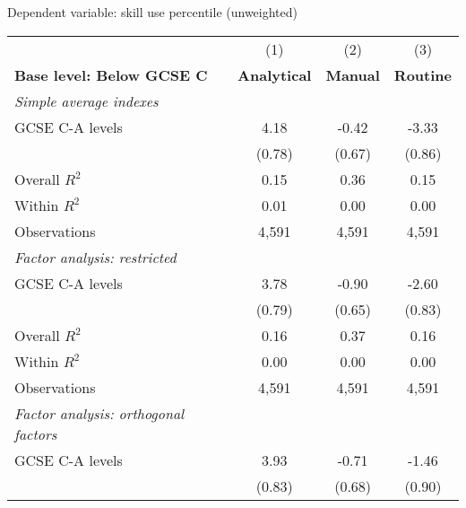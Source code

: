 \begin{center}
\begin{threeparttable}[!h]
\caption{Dependent variable: skill use percentile (unweighted)}
\label{tab:skillRegs}
\begin{tabular}{lccc}
\toprule
\toprule
&\multicolumn{1}{c}{(1)}&\multicolumn{1}{c}{(2)}&\multicolumn{1}{c}{(3)} \\
\textbf{Base level: Below GCSE C}&\multicolumn{1}{c}{\textbf{Analytical}}&\multicolumn{1}{c}{\textbf{Manual}}&\multicolumn{1}{c}{\textbf{Routine}} \\
\midrule
\textit{Simple average indexes} \vspace{1mm}\\ 
\hspace{3mm}GCSE C-A levels&        4.18\sym{***}&       -0.42         &       -3.33\sym{***}\\
                    &      (0.78)         &      (0.67)         &      (0.86)         \\
\midrule Overall $ R^2$&        0.15         &        0.36         &        0.15         \\
Within $ R^2$       &        0.01         &        0.00         &        0.00         \\
Observations        &       4,591         &       4,591         &       4,591         \\
\midrule\vspace{1mm} \textit{Factor analysis: restricted} \\ 
\hspace{3mm}GCSE C-A levels&        3.78\sym{***}&       -0.90         &       -2.60\sym{**} \\
                    &      (0.79)         &      (0.65)         &      (0.83)         \\
\midrule Overall $ R^2$&        0.16         &        0.37         &        0.16         \\
Within $ R^2$       &        0.00         &        0.00         &        0.00         \\
Observations        &       4,591         &       4,591         &       4,591         \\
\midrule\vspace{1mm} \textit{Factor analysis: orthogonal factors} \\ 
\hspace{3mm}GCSE C-A levels&        3.93\sym{***}&       -0.71         &       -1.46         \\
                    &      (0.83)         &      (0.68)         &      (0.90)         \\

\end{tabular}
\end{threeparttable}
\end{center}
